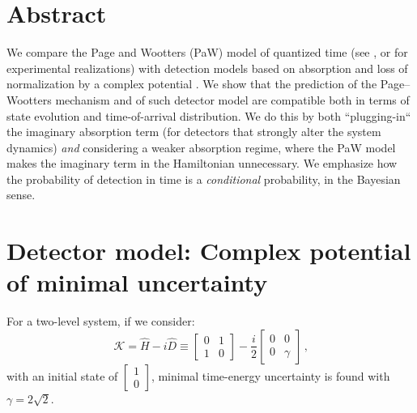 \documentclass[a0,portrait]{a0poster}
\DeclareMathOperator*{\repr}{\equiv}      %
\begin{document}
\begin{multicols}{2} %


\color{Navy} %

\section*{\large Abstract}
We compare the Page and Wootters (PaW) model of quantized time
(see \cite{PageWootters, Lloyd:Time},
or \cite{Moreva:illustration, Moreva_position} for experimental realizations)
with detection models based on absorption and loss of normalization
by a complex potential \cite{RuschhauptAbsorption}. We show that the prediction
of the Page--Wootters mechanism and of such detector model are compatible both in terms
of state evolution and time-of-arrival distribution. We do this by both ``plugging-in``
the imaginary absorption term (for detectors that strongly alter the system dynamics)
\emph{and} considering a weaker absorption regime, where the PaW model makes
the imaginary term in the Hamiltonian unnecessary. We emphasize how the probability
of detection in time is a \emph{conditional}
probability, in the Bayesian \cite{Maccone:QMOT} sense.



\setlength{\parindent}{1.5em} %


\large

\color{DarkSlateGray} %

\section*{Detector model: Complex potential of minimal uncertainty \cite{RuschhauptAbsorption}}

For a two-level system, if we consider:
\begin{equation}\label{eq:complexpot}
  \mathcal{K} = \hat{H} - i\hat{D} \repr
    \left[\begin{matrix}0 & 1\\1 & 0\end{matrix}\right] -
    \frac{i}{2} \left[\begin{matrix}0 & 0\\0 & \gamma \end{matrix}\right]
    \,\text{,}
\end{equation}
with an initial state of $\left[\begin{matrix}1\\0\end{matrix}\right]$,
minimal time-energy uncertainty is found with $\gamma = 2\sqrt{2}$.


\end{multicols}
\end{document}
